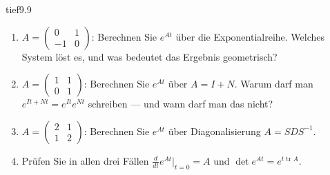 \begin{karte}{tief}{9.9}{\typtypisch}{}
\begin{enumerate}[label=(\alph*),leftmargin=1.6em,itemsep=2pt]
\item $A = \begin{pmatrix}0&1\\-1&0\end{pmatrix}$: Berechnen Sie $e^{At}$ über die Exponentialreihe. Welches System löst es, und was bedeutet das Ergebnis geometrisch?
\item $A = \begin{pmatrix}1&1\\0&1\end{pmatrix}$: Berechnen Sie $e^{At}$ über $A = I + N$. Warum darf man $e^{I t + Nt} = e^{It}e^{Nt}$ schreiben --- und wann darf man das nicht?
\item $A = \begin{pmatrix}2&1\\1&2\end{pmatrix}$: Berechnen Sie $e^{At}$ über Diagonalisierung $A = SDS^{-1}$.
\item Prüfen Sie in allen drei Fällen $\frac d{dt}e^{At}\big|_{t = 0} = A$ und $\det e^{At} = e^{t\operatorname{tr}A}$.
\end{enumerate}
\end{karte}

